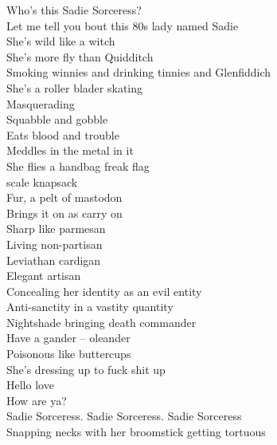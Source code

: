 


Who's this Sadie Sorceress?\\

Let me tell you bout this 80s lady named Sadie\\
She's wild like a witch\\
She's more fly than Quidditch\\
Smoking winnies and drinking tinnies and Glenfiddich\\
She's a roller blader skating\\
Masquerading\\
Squabble and gobble\\
Eats blood and trouble\\
Meddles in the metal in it\\
She flies a handbag freak flag\\
 scale knapsack\\
Fur, a pelt of mastodon\\
Brings it on as carry on\\
Sharp like parmesan\\
Living non-partisan\\
Leviathan cardigan\\
Elegant artisan\\
Concealing her identity as an evil entity\\
Anti-sanctity in a vastity quantity\\
Nightshade bringing death commander\\
Have a gander -- oleander\\
Poisonous like buttercups\\
She's dressing up to fuck shit up\\

Hello love\\
How are ya?\\

Sadie Sorceress. Sadie Sorceress. Sadie Sorceress\\
Snapping necks with her broomstick getting tortuous\\

